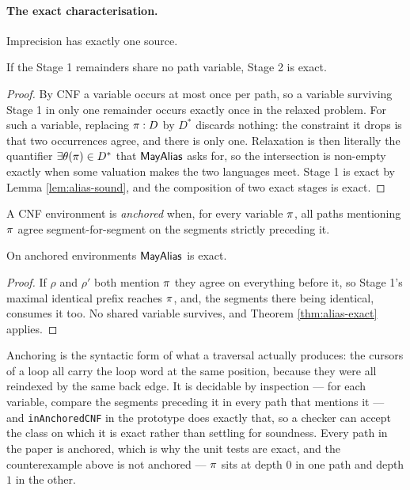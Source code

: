 \paragraph{The exact characterisation.}  Imprecision has exactly one source.

\begin{theorem}[Exactness]
\label{thm:alias-exact}
If the Stage 1 remainders share no path variable, Stage 2 is exact.
\end{theorem}
\begin{proof}
By CNF a variable occurs at most once per path, so a variable surviving Stage 1
in only one remainder occurs exactly once in the relaxed problem.  For such a
variable, replacing $\pi : D$ by $D^{*}$ discards nothing: the constraint it
drops is that two occurrences agree, and there is only one.  Relaxation is then
literally the quantifier $\exists\theta(\pi) \in D^{*}$ that $\textsf{MayAlias}$ asks
for, so the intersection is non-empty exactly when some valuation makes the two
languages meet.  Stage 1 is exact by Lemma \ref{lem:alias-sound}, and the
composition of two exact stages is exact.
\end{proof}

\begin{definition}
\label{def:anchored}
A CNF environment is \emph{anchored} when, for every variable $\pi$, all paths
mentioning $\pi$ agree segment-for-segment on the segments strictly preceding
it.
\end{definition}

\begin{corollary}
\label{cor:anchored-exact}
On anchored environments $\textsf{MayAlias}$ is exact.
\end{corollary}
\begin{proof}
If $\rho$ and $\rho'$ both mention $\pi$ they agree on everything before it, so
Stage 1's maximal identical prefix reaches $\pi$, and, the segments there being
identical, consumes it too.  No shared variable survives, and
Theorem \ref{thm:alias-exact} applies.
\end{proof}

Anchoring is the syntactic form of what a traversal actually produces: the
cursors of a loop all carry the loop word at the same position, because they were
all reindexed by the same back edge.  It is decidable by inspection --- for each
variable, compare the segments preceding it in every path that mentions it ---
and \texttt{inAnchoredCNF} in the prototype does exactly that, so a checker can
accept the class on which it is exact rather than settling for soundness.  Every path in the paper is anchored, which
is why the unit tests are exact, and the counterexample above is not anchored ---
$\pi$ sits at depth $0$ in one path and depth $1$ in the other.

